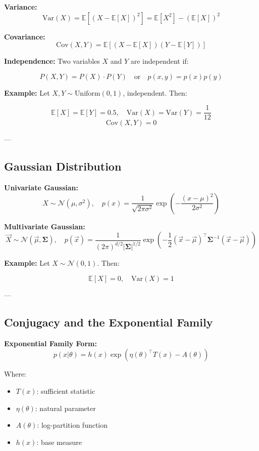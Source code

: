 \textbf{Variance:}
\[
\mathrm{Var}(X) = \mathbb{E}[(X - \mathbb{E}[X])^2] = \mathbb{E}[X^2] - (\mathbb{E}[X])^2
\]

\textbf{Covariance:}
\[
\mathrm{Cov}(X, Y) = \mathbb{E}[(X - \mathbb{E}[X])(Y - \mathbb{E}[Y])]
\]

\textbf{Independence:}  
Two variables \( X \) and \( Y \) are independent if:

\[
P(X, Y) = P(X) \cdot P(Y) \quad \text{or} \quad p(x, y) = p(x)p(y)
\]

\textbf{Example:}  
Let \( X, Y \sim \text{Uniform}(0,1) \), independent. Then:

\[
\mathbb{E}[X] = \mathbb{E}[Y] = 0.5, \quad \mathrm{Var}(X) = \mathrm{Var}(Y) = \frac{1}{12}
\]
\[
\mathrm{Cov}(X, Y) = 0
\]

---

\subsection{Gaussian Distribution}

\textbf{Univariate Gaussian:}
\[
X \sim \mathcal{N}(\mu, \sigma^2), \quad p(x) = \frac{1}{\sqrt{2\pi \sigma^2}} \exp\left(-\frac{(x - \mu)^2}{2\sigma^2}\right)
\]

\textbf{Multivariate Gaussian:}
\[
\vec{X} \sim \mathcal{N}(\vec{\mu}, \boldsymbol{\Sigma}), \quad
p(\vec{x}) = \frac{1}{(2\pi)^{d/2} |\boldsymbol{\Sigma}|^{1/2}} \exp\left(-\frac{1}{2} (\vec{x} - \vec{\mu})^\top \boldsymbol{\Sigma}^{-1} (\vec{x} - \vec{\mu})\right)
\]

\textbf{Example:}  
Let \( X \sim \mathcal{N}(0,1) \). Then:

\[
\mathbb{E}[X] = 0, \quad \mathrm{Var}(X) = 1
\]

---

\subsection{Conjugacy and the Exponential Family}

\textbf{Exponential Family Form:}
\[
p(x|\theta) = h(x) \exp\left( \eta(\theta)^\top T(x) - A(\theta) \right)
\]

Where:
\begin{itemize}
    \item \( T(x) \): sufficient statistic
    \item \( \eta(\theta) \): natural parameter
    \item \( A(\theta) \): log-partition function
    \item \( h(x) \): base measure
\end{itemize}

